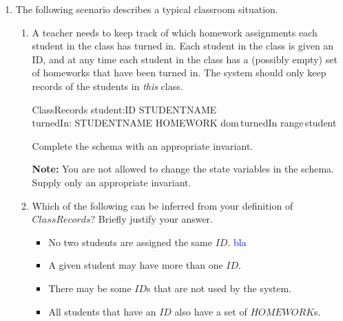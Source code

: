 \documentclass{article}
\begin{document}
\begin{enumerate}
\begin{enumerate}
\end{enumerate}

\item The following scenario describes a typical classroom
situation.

\begin{enumerate} \item A teacher needs to keep track of
which homework assignments each student in the class has turned
in. Each student in the class is given an ID, and at any time each
student in the class has a (possibly empty) set of homeworks that
have been turned in. The system should only keep records of the
students in {\em this\/} class.

\begin{zed}
\end{zed}
\begin{schema}{ClassRecords}
    student:ID \pfun STUDENTNAME \\
    turnedIn: STUDENTNAME \pfun \power HOMEWORK
\where
\color{blue}
dom\,turnedIn \subseteq range\,student 
\end{schema}

Complete the schema with an appropriate invariant.

\textbf{Note:} You are not allowed to change the state variables
in the schema. Supply only an appropriate invariant.


\item Which of the following can be inferred from your definition
of $ClassRecords$? Briefly justify your answer.

\begin{itemize}
\item No two students are assigned the same $ID$.
  \textcolor{blue}{bla}

\item A given student may have more than one $ID$.

\item There may be some $ID$s that are not used by the system.

\item All students that have an $ID$ also have a set of
$HOMEWORK$s.


\end{itemize}
\end{enumerate}
\end{enumerate}
\end{document}
